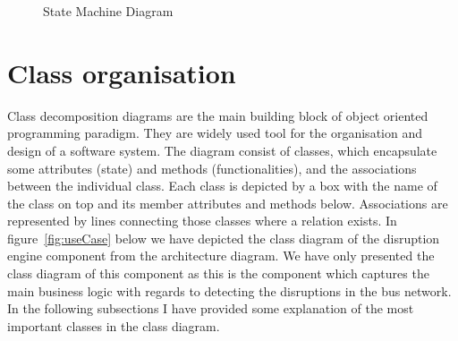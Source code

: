 \begin{figure}
	\caption{State Machine Diagram}
\label{fig:stateMachine}
\end{figure}

\FloatBarrier
\section{Class organisation}
Class decomposition diagrams are the main building block of object oriented programming paradigm. They are widely used tool for the organisation and design of a software system. The diagram consist of classes, which encapsulate some attributes (state) and methods (functionalities), and the associations between the individual class. Each class is depicted by a box with the name of the class on top and its member attributes and methods below. Associations are represented by lines connecting those classes where a relation exists. In figure~\ref{fig:useCase} below we have depicted the class diagram of the disruption engine component from the architecture diagram. We have only presented the class diagram of this component as this is the component which captures the main business logic with regards to detecting the disruptions in the bus network. In the following subsections I have provided some explanation of the most important classes in the class diagram.

